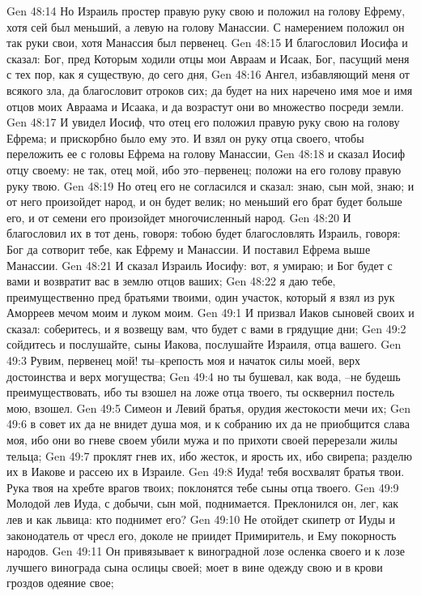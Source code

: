 Gen 48:14  Но Израиль простер правую руку свою и положил на голову Ефрему, хотя сей был меньший, а левую на голову Манассии. С намерением положил он так руки свои, хотя Манассия был первенец.
Gen 48:15  И благословил Иосифа и сказал: Бог, пред Которым ходили отцы мои Авраам и Исаак, Бог, пасущий меня с тех пор, как я существую, до сего дня,
Gen 48:16  Ангел, избавляющий меня от всякого зла, да благословит отроков сих; да будет на них наречено имя мое и имя отцов моих Авраама и Исаака, и да возрастут они во множество посреди земли.
Gen 48:17  И увидел Иосиф, что отец его положил правую руку свою на голову Ефрема; и прискорбно было ему это. И взял он руку отца своего, чтобы переложить ее с головы Ефрема на голову Манассии,
Gen 48:18  и сказал Иосиф отцу своему: не так, отец мой, ибо это--первенец; положи на его голову правую руку твою.
Gen 48:19  Но отец его не согласился и сказал: знаю, сын мой, знаю; и от него произойдет народ, и он будет велик; но меньший его брат будет больше его, и от семени его произойдет многочисленный народ.
Gen 48:20  И благословил их в тот день, говоря: тобою будет благословлять Израиль, говоря: Бог да сотворит тебе, как Ефрему и Манассии. И поставил Ефрема выше Манассии.
Gen 48:21  И сказал Израиль Иосифу: вот, я умираю; и Бог будет с вами и возвратит вас в землю отцов ваших;
Gen 48:22  я даю тебе, преимущественно пред братьями твоими, один участок, который я взял из рук Аморреев мечом моим и луком моим.
Gen 49:1  И призвал Иаков сыновей своих и сказал: соберитесь, и я возвещу вам, что будет с вами в грядущие дни;
Gen 49:2  сойдитесь и послушайте, сыны Иакова, послушайте Израиля, отца вашего.
Gen 49:3  Рувим, первенец мой! ты--крепость моя и начаток силы моей, верх достоинства и верх могущества;
Gen 49:4  но ты бушевал, как вода, --не будешь преимуществовать, ибо ты взошел на ложе отца твоего, ты осквернил постель мою, взошел.
Gen 49:5  Симеон и Левий братья, орудия жестокости мечи их;
Gen 49:6  в совет их да не внидет душа моя, и к собранию их да не приобщится слава моя, ибо они во гневе своем убили мужа и по прихоти своей перерезали жилы тельца;
Gen 49:7  проклят гнев их, ибо жесток, и ярость их, ибо свирепа; разделю их в Иакове и рассею их в Израиле.
Gen 49:8  Иуда! тебя восхвалят братья твои. Рука твоя на хребте врагов твоих; поклонятся тебе сыны отца твоего.
Gen 49:9  Молодой лев Иуда, с добычи, сын мой, поднимается. Преклонился он, лег, как лев и как львица: кто поднимет его?
Gen 49:10  Не отойдет скипетр от Иуды и законодатель от чресл его, доколе не приидет Примиритель, и Ему покорность народов.
Gen 49:11  Он привязывает к виноградной лозе осленка своего и к лозе лучшего винограда сына ослицы своей; моет в вине одежду свою и в крови гроздов одеяние свое;
